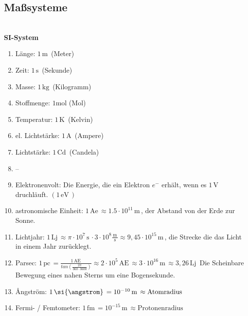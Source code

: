 \documentclass[a4paper,12pt]{article}
\begin{document}
\subsection{Maßsysteme}
\hfill\\\textbf{SI-System}
\begin{enumerate}[wide,label=$\cdot$]
        \item Länge: $1\,\text{m}\,$ (Meter)
        \item Zeit: $1\,\text{s}\,$ (Sekunde)
        \item Masse: $1\,\text{kg}\,$ (Kilogramm)
        \item Stoffmenge: $1\text{mol}$ (Mol)
        \item Temperatur: $1\,\text{K}\,$ (Kelvin)
        \item el. Lichtstärke: $1\,\text{A}\,$ (Ampere)
        \item Lichtstärke: $1\,\text{Cd}\,$ (Candela)
        \item[] --
        \item Elektronenvolt: Die Energie, die ein Elektron $e^{-}$ erhält, wenn es $1\,\text{V}\,$ druchläuft. $\left( 1\,\text{eV}\,\right) $ 
        \item astronomische Einheit: $1\,\text{Ae}\, \approx 1.5\cdot 10^{11}\,\text{m}\,$, der Abstand von der Erde zur Sonne.
        \item Lichtjahr: $1\,\text{Lj}\,\approx \pi \cdot 10^{7}\,\text{s}\,\cdot 3\cdot 10^{8}\tfrac{\,\text{m}\,}{\,\text{s}\,}\approx 9,45\cdot 10^{15}\,\text{m}\,$, die Strecke die das Licht in einem Jahr zurücklegt.
        \item Parsec: $1\,\text{pc}\,=\tfrac{1\,\text{AE}\,}{tan\left( \tfrac{2\pi }{360\cdot 3600}\right) }\approx 2\cdot 10^{5}\,\text{AE}\,\approx 3\cdot 10^{16}\,\text{m}\,\approx 3,26\,\text{Lj}\,$ Die Scheinbare Bewegung eines nahen Sterns um eine Bogensekunde.
        \item \si{\angstrom}ngström: $1\,\text{\si{\angstrom}}\,=10^{-10}\,\text{m}\,\approx \text{Atomradius}$ 
        \item Fermi- / Femtometer: $1\,\text{fm}\,=10^{-15}\,\text{m}\,\approx \text{Protonenradius}$ 
\end{enumerate}
\end{document}
